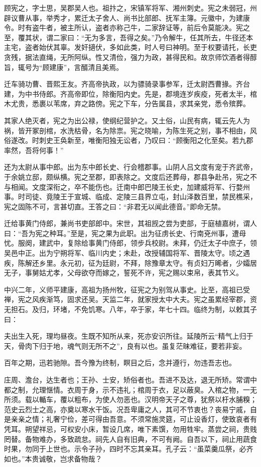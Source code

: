 \documentclass[12pt,UTF8]{ctexbook}
\begin{document}
顾宪之，字士思，吴郡吴人也。祖抃之，宋镇军将军、湘州刺史。宪之未弱冠，州辟议曹从事，举秀才，累迁太子舍人、尚书比部郎、抚军主簿。元徽中，为建康令。时有盗牛者，被主所认，盗者亦称己牛，二家辞证等，前后令莫能决。宪之至，覆其状，谓二家曰：“无为多言，吾得之矣。”乃令解牛，任其所去，牛径还本主宅，盗者始伏其辜。发奸擿伏，多如此类，时人号曰神明。至于权要请托，长吏贪残，据法直绳，无所阿纵。性又清俭，强力为政，甚得民和。故京师饮酒者得醇旨，辄号为“顾建康”，言醑清且美焉。

迁车骑功曹、晋熙王友。齐高帝执政，以为骠骑录事参军，迁太尉西曹掾。齐台建，为中书侍郎。齐高帝即位，除衡阳内史。先是，郡境连岁疾疫，死者太半，棺木尤贵，悉裹以苇席，弃之路傍。宪之下车，分告属县，求其亲党，悉令殡葬。

其家人绝灭者，宪之为出公禄，使纲纪营护之。又土俗，山民有病，辄云先人为祸，皆开冢剖棺，水洗枯骨，名为除祟。宪之晓喻，为陈生死之别，事不相由，风俗遂改。时刺史王奂新至，唯衡阳独无讼者，乃叹曰：“顾衡阳之化至矣。若九郡率然，吾将何事！”

还为太尉从事中郎。出为东中郎长史、行会稽郡事。山阴人吕文度有宠于齐武帝，于余姚立邸，颇纵横。宪之至郡，即表除之。文度后还葬母，郡县争赴吊，宪之不与相闻。文度深衔之，卒不能伤也。迁南中郎巴陵王长史，加建威将军、行婺州事。时司徒、竟陵王于宣城、临成、定陵三县界立屯，封山泽数百里，禁民樵采，宪之固陈不可，言甚切直。王答之曰：“非君无以闻此德音。”即命无禁。

迁给事黄门侍郎，兼尚书吏部郎中。宋世，其祖觊之尝为吏部，于庭植嘉树，谓人曰：“吾为宪之种耳。”至是，宪之果为此职。出为征虏长史、行南兗州事，遭母忧。服阕，建武中，复除给事黄门侍郎，领步兵校尉。未拜，仍迁太子中庶子，领吴邑中正。出为宁朔将军、临川内史；未赴，改授辅国将军、晋陵太守。顷之遇疾，陈解还乡里。永元初，征为廷尉，不拜，除豫章太守。有贞妇万晞者，少孀居无子，事舅姑尤孝，父母欲夺而嫁之，誓死不许，宪之赐以束帛，表其节义。

中兴二年，义师平建康，高祖为扬州牧，征宪之为别驾从事史。比至，高祖已受禅，宪之风疾渐笃，固求还吴。天监二年，就家授太中大夫。宪之虽累经宰郡，资无担石。及归，环堵，不免饥寒。八年，卒于家，年七十四。临终为制，以敕其子曰：

夫出生入死，理均昼夜。生既不知所从来，死亦安识所往。延陵所云“精气上归于天，骨肉下归于地，魂气则无所不之”，良有以也。虽复茫昧难征，要若非妄。

百年之期，迅若驰隙。吾今豫为终制，瞑目之后，念并遵行，勿违吾志也。

庄周、澹台，达生者也；王孙、士安，矫俗者也。吾进不及达，退无所矫。常谓中都之制，允理惬情。衣周于身，示不违礼；棺周于衣，足以蔽臭。入棺之物，一无所须。载以輴车，覆以粗布，为使人勿恶也。汉明帝天子之尊，犹祭以杅水脯糗；范史云烈士之高，亦奠以寒水干饭。况吾卑庸之人，其可不节衷也？丧易宁戚，自是亲亲之情；礼奢宁俭，差可得由吾意。不须常施灵筵，可止设香灯，使致哀者有凭耳。朔望祥忌，可权安小床，暂设几席，唯下素馔，勿用牲牢。蒸尝之祠，贵贱罔替。备物难办，多致疏怠。祠先人自有旧典，不可有阙。自吾以下，祠止用蔬食时果，勿同于上世也。示令子孙，四时不忘其亲耳。孔子云：“虽菜羹瓜祭，必齐如也。”本贵诚敬，岂求备物哉？
\end{document}
